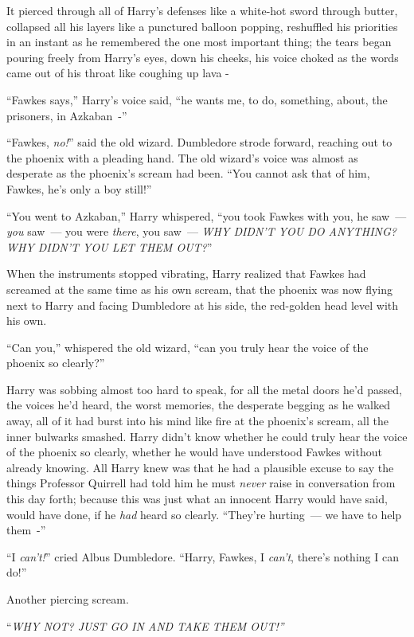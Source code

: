 It pierced through all of Harry's defenses like a white-hot sword through butter, collapsed all his layers like a punctured balloon popping, reshuffled his priorities in an instant as he remembered the one most important thing; the tears began pouring freely from Harry's eyes, down his cheeks, his voice choked as the words came out of his throat like coughing up lava -

``Fawkes says,'' Harry's voice said, ``he wants me, to do, something, about, the prisoners, in Azkaban~-''

``Fawkes, \emph{no!}'' said the old wizard. Dumbledore strode forward, reaching out to the phoenix with a pleading hand. The old wizard's voice was almost as desperate as the phoenix's scream had been. ``You cannot ask that of him, Fawkes, he's only a boy still!''

``You went to Azkaban,'' Harry whispered, ``you took Fawkes with you, he saw~--- \emph{you} saw~--- you were \emph{there}, you saw~--- \emph{WHY DIDN'T YOU DO ANYTHING? WHY DIDN'T YOU LET THEM OUT?}''

When the instruments stopped vibrating, Harry realized that Fawkes had screamed at the same time as his own scream, that the phoenix was now flying next to Harry and facing Dumbledore at his side, the red-golden head level with his own.

``Can you,'' whispered the old wizard, ``can you truly hear the voice of the phoenix so clearly?''

Harry was sobbing almost too hard to speak, for all the metal doors he'd passed, the voices he'd heard, the worst memories, the desperate begging as he walked away, all of it had burst into his mind like fire at the phoenix's scream, all the inner bulwarks smashed. Harry didn't know whether he could truly hear the voice of the phoenix so clearly, whether he would have understood Fawkes without already knowing. All Harry knew was that he had a plausible excuse to say the things Professor Quirrell had told him he must \emph{never} raise in conversation from this day forth; because this was just what an innocent Harry would have said, would have done, if he \emph{had} heard so clearly. ``They're hurting~--- we have to help them~-''

``I \emph{can't!}'' cried Albus Dumbledore. ``Harry, Fawkes, I \emph{can't}, there's nothing I can do!''

Another piercing scream.

``\emph{WHY NOT? JUST GO IN AND TAKE THEM OUT!''}

